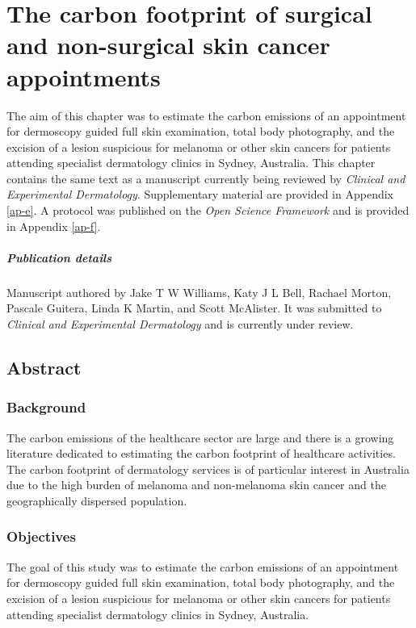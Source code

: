 \chapter{The carbon footprint of surgical and non-surgical skin cancer appointments}
\label{ch-6}
\begin{refsection}

The aim of this chapter was to estimate the carbon emissions of an appointment for dermoscopy guided full skin examination, total body photography, and the excision of a lesion suspicious for melanoma or other skin cancers for patients attending specialist dermatology clinics in Sydney, Australia. This chapter contains the same text as a manuscript currently being reviewed by \textit{Clinical and Experimental Dermatology}. Supplementary material are provided in Appendix \ref{ap-e}. A protocol was published on the \textit{Open Science Framework} and is provided in Appendix \ref{ap-f}.

\paragraph*{Publication details}
Manuscript authored by Jake T W Williams, Katy J L Bell, Rachael Morton, Pascale Guitera, Linda K Martin, and Scott McAlister. It was submitted to \textit{Clinical and Experimental Dermatology} and is currently under review.

\clearpage

\section{Abstract}

\subsection{Background}
The carbon emissions of the healthcare sector are large and there is a growing literature dedicated to estimating the carbon footprint of healthcare activities. The carbon footprint of dermatology services is of particular interest in Australia due to the high burden of melanoma and non-melanoma skin cancer and the geographically dispersed population.

\subsection{Objectives}
The goal of this study was to estimate the carbon emissions of an appointment for dermoscopy guided full skin examination, total body photography, and the excision of a lesion suspicious for melanoma or other skin cancers for patients attending specialist dermatology clinics in Sydney, Australia. 


\end{refsection}
